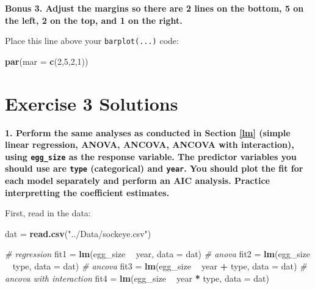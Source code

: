 \documentclass[]{book}
\newenvironment{Shaded}{\begin{snugshade}}{\end{snugshade}}
\newcommand{\CommentTok}[1]{\textcolor[rgb]{0.56,0.35,0.01}{\textit{#1}}}
\newcommand{\DataTypeTok}[1]{\textcolor[rgb]{0.13,0.29,0.53}{#1}}
\newcommand{\DecValTok}[1]{\textcolor[rgb]{0.00,0.00,0.81}{#1}}
\newcommand{\KeywordTok}[1]{\textcolor[rgb]{0.13,0.29,0.53}{\textbf{#1}}}
\newcommand{\NormalTok}[1]{#1}
\newcommand{\OperatorTok}[1]{\textcolor[rgb]{0.81,0.36,0.00}{\textbf{#1}}}
\newcommand{\StringTok}[1]{\textcolor[rgb]{0.31,0.60,0.02}{#1}}
\begin{document}
\textbf{Bonus 3. Adjust the margins so there are 2 lines on the bottom, 5 on the left, 2 on the top, and 1 on the right.}

Place this line above your \texttt{barplot(...)} code:

\begin{Shaded}
\begin{Highlighting}[]
\KeywordTok{par}\NormalTok{(}\DataTypeTok{mar =} \KeywordTok{c}\NormalTok{(}\DecValTok{2}\NormalTok{,}\DecValTok{5}\NormalTok{,}\DecValTok{2}\NormalTok{,}\DecValTok{1}\NormalTok{))}
\end{Highlighting}
\end{Shaded}

\hypertarget{ex3-answers}{%
\section*{Exercise 3 Solutions}\label{ex3-answers}}

\textbf{1. Perform the same analyses as conducted in Section \ref{lm} (simple linear regression, ANOVA, ANCOVA, ANCOVA with interaction), using \texttt{egg\_size} as the response variable. The predictor variables you should use are \texttt{type} (categorical) and \texttt{year}. You should plot the fit for each model separately and perform an AIC analysis. Practice interpretting the coefficient estimates.}

First, read in the data:

\begin{Shaded}
\begin{Highlighting}[]
\NormalTok{dat =}\StringTok{ }\KeywordTok{read.csv}\NormalTok{(}\StringTok{"../Data/sockeye.csv"}\NormalTok{)}
\end{Highlighting}
\end{Shaded}

\begin{Shaded}
\begin{Highlighting}[]
\CommentTok{# regression}
\NormalTok{fit1 =}\StringTok{ }\KeywordTok{lm}\NormalTok{(egg_size }\OperatorTok{~}\StringTok{ }\NormalTok{year, }\DataTypeTok{data =}\NormalTok{ dat)}
\CommentTok{# anova}
\NormalTok{fit2 =}\StringTok{ }\KeywordTok{lm}\NormalTok{(egg_size }\OperatorTok{~}\StringTok{ }\NormalTok{type, }\DataTypeTok{data =}\NormalTok{ dat)}
\CommentTok{# ancova}
\NormalTok{fit3 =}\StringTok{ }\KeywordTok{lm}\NormalTok{(egg_size }\OperatorTok{~}\StringTok{ }\NormalTok{year }\OperatorTok{+}\StringTok{ }\NormalTok{type, }\DataTypeTok{data =}\NormalTok{ dat)}
\CommentTok{# ancova with interaction}
\NormalTok{fit4 =}\StringTok{ }\KeywordTok{lm}\NormalTok{(egg_size }\OperatorTok{~}\StringTok{ }\NormalTok{year }\OperatorTok{*}\StringTok{ }\NormalTok{type, }\DataTypeTok{data =}\NormalTok{ dat)}
\end{Highlighting}
\end{Shaded}
\end{document}
